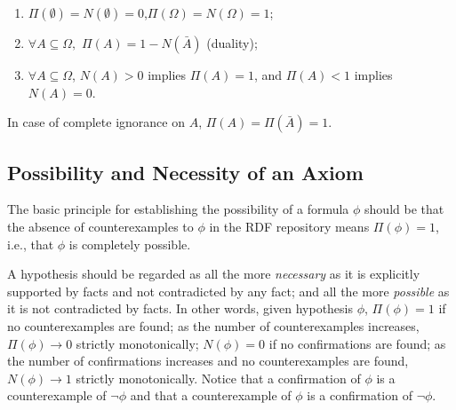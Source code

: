 \documentclass{llncs}
\begin{document}
\begin{enumerate}
  \item $\Pi(\emptyset) = N(\emptyset) = 0$,\quad $\Pi(\Omega) = N(\Omega) = 1$;
  \item $\forall A\subseteq \Omega,$ $\Pi(A) = 1 - N(\bar{A})$ (duality);
  \item $\forall A\subseteq \Omega$, $N(A) > 0$ implies $\Pi(A) = 1$, and $\Pi(A) < 1$ implies $N(A) = 0$.
\end{enumerate}
In case of complete ignorance on $A$, $\Pi(A) = \Pi(\bar{A}) = 1$.


\subsection{Possibility and Necessity of an Axiom}

The basic principle for establishing the possibility of a formula $\phi$ should be
that the absence of counterexamples to $\phi$ in the RDF repository means $\Pi(\phi) = 1$,
i.e., that $\phi$ is completely possible.

A hypothesis should be regarded as all the more
\emph{necessary} as it is explicitly supported by facts and not contradicted by any fact;
and all the more \emph{possible} as it is not contradicted by facts.
In other words, given hypothesis $\phi$, $\Pi(\phi) = 1$ if no counterexamples are found; 
as the number of counterexamples increases, $\Pi(\phi) \to 0$ strictly monotonically;
$N(\phi) = 0$ if no confirmations are found; as the number of confirmations increases
and no counterexamples are found, $N(\phi) \to 1$ strictly monotonically.
Notice that a confirmation of $\phi$ is a counterexample of $\neg\phi$
and that a counterexample of $\phi$ is a confirmation of $\neg\phi$.
\end{document}
